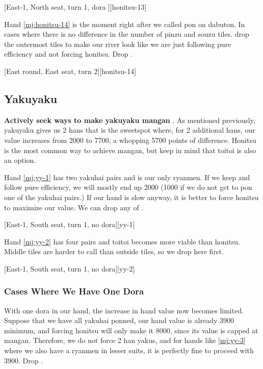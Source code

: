 \documentclass[12pt]{article}
\begin{document}
[East-1, North seat, turn 1, dora ][honitsu-13]

Hand \ref{mj:honitsu-14} is the moment right after we called pon on dabuton. In cases where there is no difference in the number of pinzu and souzu tiles. drop the outermost tiles to make our river look like we are just following pure efficiency and not forcing honitsu. Drop  \citep[][pp.~120--121]{suzuki}.

[East round, East seat, turn 2][honitsu-14]


\subsection{Yakuyaku}

\textbf{Actively seek ways to make yakuyaku mangan }\citep{yoteru-yakuyaku}. As mentioned previously, yakuyaku gives us 2 hans that is the sweetspot where, for 2 additional hans, our value increases from 2000 to 7700, a whopping 5700 points of difference. Honitsu is the most common way to achieve mangan, but keep in mind that toitoi is also an option.

Hand \ref{mj:yy-1} has two yakuhai pairs and  is our only ryanmen. If we keep  and follow pure efficiency, we will mostly end up 2000 (1000 if we do not get to pon one of the yakuhai pairs.) If our hand is slow anyway, it is better to force honitsu to maximize our value. We can drop any of .

[East-1, South seat, turn 1, no dora][yy-1]

Hand \ref{mj:yy-2} has four pairs and toitoi becomes more viable than honitsu. Middle tiles are harder to call than outside tiles, so we drop  here first.

[East-1, South seat, turn 1, no dora][yy-2]


\subsubsection*{Cases Where We Have One Dora}

With one dora in our hand, the increase in hand value now becomes limited. Suppose that we have all yakuhai ponned, our hand value is already 3900 minimum, and forcing honitsu will only make it 8000, since its value is capped at mangan. Therefore, we do not force 2 han yakus, and for hands like \ref{mj:yy-3} where we also have a ryanmen in lesser suits, it is perfectly fine to proceed with 3900. Drop .
\end{document}
